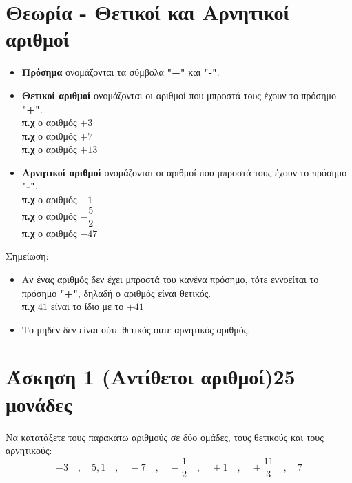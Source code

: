 \documentclass[a4paper,10pt]{report}
\begin{document}
\section*{Θεωρία - Θετικοί και Αρνητικοί αριθμοί\hfill \small{}}
\begin{itemize}
 \item \textbf{Πρόσημα} ονομάζονται τα σύμβολα \textbf{"+"} και \textbf{"-"}.              
 \item \textbf{Θετικοί αριθμοί} ονομάζονται οι αριθμοί που μπροστά τους έχουν το πρόσημο \textbf{"+"}. \\
        \textbf{π.χ} ο αριθμός $+3 $ \\
       \textbf{π.χ} ο αριθμός $+7 $\\
       \textbf{π.χ} ο αριθμός $+13 $
 \item \textbf{Αρνητικοί αριθμοί} ονομάζονται οι αριθμοί που μπροστά τους έχουν το πρόσημο \textbf{"-"}.\\
        \textbf{π.χ} ο αριθμός $-1 $ \\
       \textbf{π.χ} ο αριθμός $-\dfrac{5}{2} $\\
       \textbf{π.χ} ο αριθμός $-47 $
\end{itemize}
Σημείωση:
\begin{itemize}
 \item Αν ένας αριθμός δεν έχει μπροστά του κανένα πρόσημο, τότε εννοείται το πρόσημο \textbf{"+"}, δηλαδή 
       ο αριθμός είναι θετικός.\\
       \textbf{π.χ} $41$ είναι το ίδιο με το $+41$ 
 \item Το μηδέν δεν είναι ούτε θετικός ούτε αρνητικός αριθμός.
\end{itemize}



\section*{Άσκηση 1  (Αντίθετοι αριθμοί)\hfill \small{25 μονάδες}}
Να κατατάξετε τους παρακάτω αριθμούς σε δύο ομάδες, τους θετικούς και τους αρνητικούς:
$$ -3 \quad ,\quad  5,1 \quad,\quad -7\quad,\quad -\dfrac{1}{2}\quad,\quad +1\quad,\quad +\dfrac{11}{3}\quad,\quad 7    $$
\end{document}
